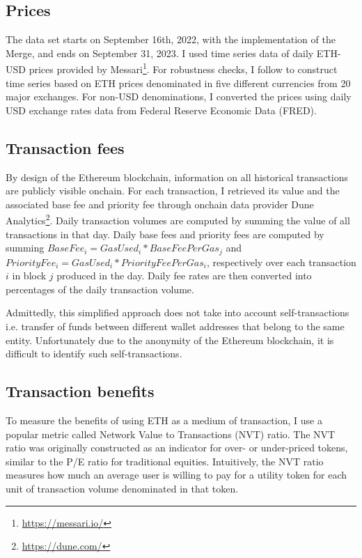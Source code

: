 \documentclass[12pt]{article}
\begin{document}
\subsection{Prices}
The data set starts on September 16th, 2022, with the implementation of the Merge, and ends on September 31, 2023. I used time series data of daily ETH-USD prices provided by Messari\footnote{\url{https://messari.io/}}. For robustness checks, I follow \cite{biais2020equilibrium} to construct time series based on ETH prices denominated in five different currencies from 20 major exchanges. For non-USD denominations, I converted the prices using daily USD exchange rates data from Federal Reserve Economic Data (FRED).


\subsection{Transaction fees}
By design of the Ethereum blockchain, information on all historical transactions are publicly visible onchain. For each transaction, I retrieved its value and the associated base fee and priority fee through onchain data provider Dune Analytics\footnote{\url{https://dune.com/}}. Daily transaction volumes are computed by summing the value of all transactions in that day. Daily base fees and priority fees are computed by summing $BaseFee_i=GasUsed_i*BaseFeePerGas_j$ and $PriorityFee_i=GasUsed_i*PriorityFeePerGas_i$, respectively over each transaction $i$ in block $j$ produced in the day. Daily fee rates are then converted into percentages of the daily transaction volume.

Admittedly, this simplified approach does not take into account self-transactions i.e. transfer of funds between different wallet addresses that belong to the same entity. Unfortunately due to the anonymity of the Ethereum blockchain, it is difficult to identify such self-transactions.

\subsection{Transaction benefits}
To measure the benefits of using ETH as a medium of transaction, I use a popular metric called Network Value to Transactions (NVT) ratio. The NVT ratio was originally constructed as an indicator for over- or under-priced tokens, similar to the P/E ratio for traditional equities. Intuitively, the NVT ratio measures how much an average user is willing to pay for a utility token for each unit of transaction volume denominated in that token. 
\end{document}
